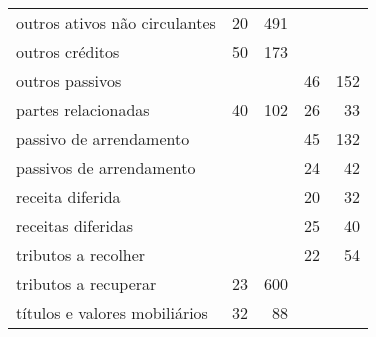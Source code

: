 \begin{table}[ht]
\begin{tabular}{lrrrr}
  outros ativos não circulantes &  20 & 491 &  &  \\ 
  outros créditos &  50 & 173 &  &  \\ 
  outros passivos &  &  &  46 & 152 \\ 
  partes relacionadas &  40 & 102 &  26 &  33 \\ 
  passivo de arrendamento &  &  &  45 & 132 \\ 
  passivos de arrendamento &  &  &  24 &  42 \\ 
  receita diferida &  &  &  20 &  32 \\ 
  receitas diferidas &  &  &  25 &  40 \\ 
  tributos a recolher &  &  &  22 &  54 \\ 
  tributos a recuperar &  23 & 600 &  &  \\ 
  títulos e valores mobiliários &  32 &  88 &  &  \\ 
   \hline
\end{tabular}
\end{table}
